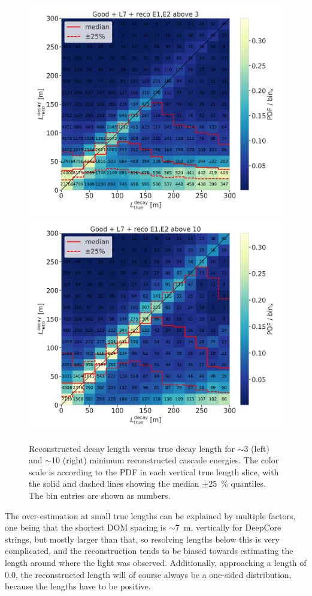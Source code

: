 \begin{figure}[h]
    \centering
    \includegraphics[width=0.49\linewidth]{figures/results/190607/resolutions/190607_millipede_level_no_NaNs_NEW_flipped_reco_decayL_vs_true_decayL_reco_above3_step_contours.png}
    \includegraphics[width=0.49\linewidth]{figures/results/190607/resolutions/190607_millipede_level_no_NaNs_NEW_flipped_reco_decayL_vs_true_decayL_reco_above10_step_contours.png}
    \caption[Preliminary two-dimensional reconstructed versus true decay length resolutions]{Reconstructed decay length versus true decay length for $\sim$\SI{3}{\gev} (left) and $\sim$\SI{10}{\gev} (right) minimum reconstructed cascade energies. The color scale is according to the PDF in each vertical true length slice, with the solid and dashed lines showing the median $\pm$\SI{25}{\percent} quantiles. The bin entries are shown as numbers.}
\end{figure}

The over-estimation at small true lengths can be explained by multiple factors, one being that the shortest DOM spacing is $\sim$\SI{7}{\meter}, vertically for DeepCore strings, but mostly larger than that, so resolving lengths below this is very complicated, and the reconstruction tends to be biased towards estimating the length around where the light was observed.
Additionally, approaching a length of 0.0, the reconstructed length will of course always be a one-sided distribution, because the lengths have to be positive.

